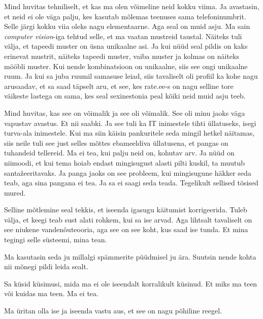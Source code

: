
Mind huvitas tehniliselt, et kas ma olen võimeline neid kokku viima. Ja avastasin, et neid ei ole väga palju, kes kasutab mõlemas teenuses sama telefoninumbrit. Selle järgi kokku viia oleks nagu elementaarne. Aga seal on muid asju. Ma sain \emph{computer vision}-iga tehtud selle, et ma vaatan mustreid taustal. Näiteks tuli välja, et tapeedi muster on üsna unikaalne asi. Ja kui nüüd seal pildis on kaks erinevat mustrit, näiteks tapeedi muster, vaiba muster ja kolmas on näiteks  mööbli muster. Kui nende kombinatsioon on unikaalne, siis see ongi unikaalne ruum. Ja kui sa juba ruumil samasuse leiad, siis tavaliselt oli profiil ka kohe nagu arusaadav, et sa saad täpselt aru, et see, kes rate.ee-s  on nagu selline tore väikeste lastega  on sama, kes seal sexinestonia peal kõiki neid muid asju teeb. 


Mind huvitas, kas see on võimalik ja see oli võimalik. See oli minu jaoks väga vapustav avastus. Et nii saabki. Ja see tuli ka IT inimestele tihti üllatuseks, isegi turva-ala inimestele. Kui ma siin käisin  pankuritele seda mingil hetkel näitamas, siis neile tuli see just selles mõttes ebameeldiva üllatusena, et pangas on tuhandeid tellereid. Ma ei tea, kui palju neid on, kohutav arv. Ja nüüd on niimoodi, et kui tema hoiab endast mingisugust alasti pilti kuskil, ta muutub santažeeritavaks. Ja panga jaoks on see probleem, kui mingisugune häkker seda teab, aga sina pangana ei tea. Ja sa ei saagi seda teada. Tegelikult sellised tõsised mured. 

Selline mõtlemine seal tekkis, et  iseenda igasugu käitumist korrigeerida. Tuleb välja, et keegi teab sust alati rohkem, kui sa ise arvad. Aga lihtsalt tavaliselt on see niukene vandenõuteooria, aga see on see koht, kus saad ise tunda. Et mina tegingi selle süsteemi, mina tean. 

Ma kasutasin seda ju millalgi spämmerite püüdmisel ju ära. Suutsin nende kohta nii mõnegi pildi leida sealt.


Sa küsid küsimusi, mida ma ei ole iseendalt korralikult küsinud. Et miks ma teen või kuidas ma teen. Ma ei tea. 


Ma üritan olla ise ja iseenda vastu aus, et see on nagu põhiline reegel. 
